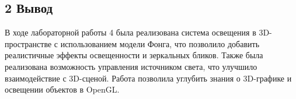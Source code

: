 \documentclass[12pt]{article}
\begin{document}
\subsection*{2 Вывод}
В ходе лабораторной работы 4 была реализована система освещения в 3D-пространстве с использованием модели Фонга, что позволило добавить реалистичные эффекты освещенности и зеркальных бликов. 
Также была реализована возможность управления источником света, что улучшило взаимодействие с 3D-сценой. 
Работа позволила углубить знания о 3D-графике и освещении объектов в OpenGL.
\end{document}
